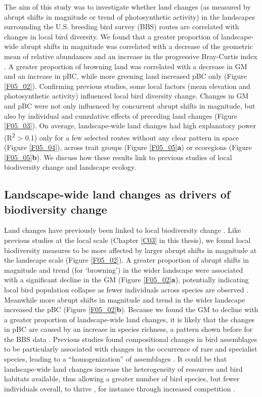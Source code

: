 The aim of this study was to investigate whether land changes (as measured by abrupt shifts in magnitude or trend of photosynthetic activity) in the landscapes surrounding the U.S. breeding bird survey (BBS) routes are correlated with changes in local bird diversity. We found that a greater proportion of landscape-wide abrupt shifts in magnitude was correlated with a decrease of the geometric mean of relative abundances \citep[GM, ][]{Buckland2011} and an increase in the progressive Bray-Curtis index \citep[pBC, ][]{Rittenhouse2010}. A greater proportion of browning land was correlated with a decrease in GM and an increase in pBC, while more greening land increased pBC only (Figure \ref{F05_02}). Confirming previous studies, some local factors (\eg mean elevation and photosynthetic activity) influenced local bird diversity change. Changes in GM and pBC were not only influenced by concurrent abrupt shifts in magnitude, but also by individual and cumulative effects of preceding land changes (Figure \ref{F05_03}). On average, landscape-wide land changes had high explanatory power (R\textsuperscript{2} > 0.1) only for a few selected routes without any clear pattern in space (Figure \ref{F05_04}), across trait groups (Figure \ref{F05_05}\textbf{a}) or ecoregions (Figure \ref{F05_05}\textbf{b}).  We discuss how these results link to previous studies of local biodiversity change and landscape ecology. 

\subsection{Landscape-wide land changes as drivers of biodiversity change}
\label{C05_0401}

Land changes have previously been linked to local biodiversity change \citep{Brooks2002,Ewers2013,Cousins2015}. Like previous studies at the local scale (Chapter \ref{C03} in this thesis), we found local biodiversity measures to be more affected by larger abrupt shifts in magnitude at the landscape scale (Figure \ref{F05_02}). A greater proportion of abrupt shifts in magnitude and trend (for ‘browning’) in the wider landscape were associated with a significant decline in the GM (Figure \ref{F05_02}\textbf{a}), potentially indicating local bird population collapse as fewer individuals across species are observed \citep{Loh2005,Buckland2011}. Meanwhile more abrupt shifts in magnitude and trend in the wider landscape increased the pBC (Figure \ref{F05_02}\textbf{b}). Because we found the GM to decline with a greater proportion of landscape-wide land changes, it is likely that the changes in pBC are caused by an increase in species richness, a pattern shown before for the BBS data \citep{Schipper2016}. Previous studies found compositional changes in bird assemblages to be particularly associated with changes in the occurrence of rare and specialist species, leading to a “homogenization” of assemblages \citep{McKinney1999,Olden2006a,Newbold2018}. It could be that landscape-wide land changes increase the heterogeneity of resources and bird habitats available, thus allowing a greater number of bird species, but fewer individuals overall, to   thrive \citep{Holt2009,Stein2014}, for instance through increased competition \citep{RandallHughes2007}. 

